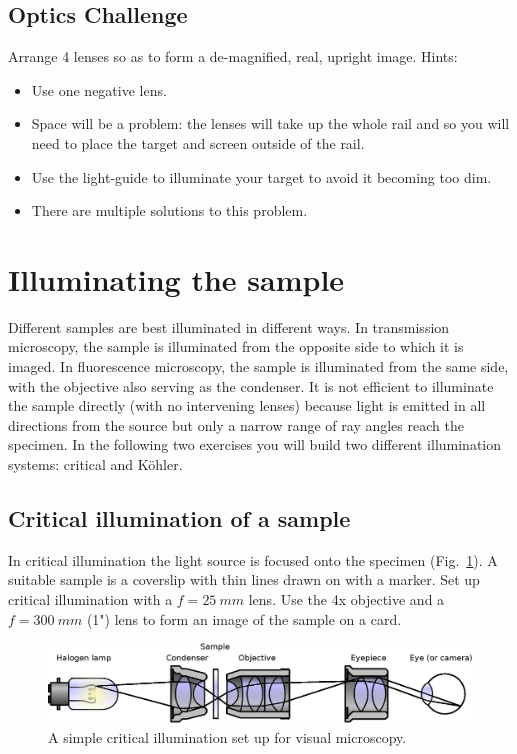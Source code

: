 \documentclass[a4paper]{report}
\begin{document}
\subsection{Optics Challenge}
Arrange 4 lenses so as to form a de-magnified, real, upright
image. Hints: 
\begin{itemize}
\item Use one negative lens.
\item Space will be a problem: the lenses will take up the whole rail
  and so you will need to place the target and screen outside of the
  rail. 
\item Use the light-guide to illuminate your target to avoid it
  becoming too dim. 
\item There are multiple solutions to this problem.
\end{itemize}


\clearpage
\section{Illuminating the sample}
Different samples are best illuminated in different ways.
In transmission microscopy, the sample is illuminated from the opposite side to which it is imaged. 
In fluorescence microscopy, the sample is illuminated from the same side, with the objective also serving as the condenser. 
It is not efficient to illuminate the sample directly (with no intervening lenses) because light is emitted in all directions from the source but only a narrow range of ray angles reach the specimen. 
In the following two exercises you will build two different illumination systems: critical and K\"{o}hler. 


\subsection{Critical illumination of a sample}
In critical illumination the light source is focused onto the specimen (Fig.~\ref{critIlum}).
A suitable sample is a coverslip with thin lines drawn on with a marker.
Set up critical illumination with a $f=25~mm$ lens. Use the 4x objective and a $f=300~mm$ (1") lens to form an image of the sample on a card.

\begin{figure}[h]
\center
\includegraphics[width=5in]{Critical_Illumination.eps}
\caption{A simple critical illumination set up for visual microscopy.}
\label{critIlum}
\end{figure}
\end{document}
